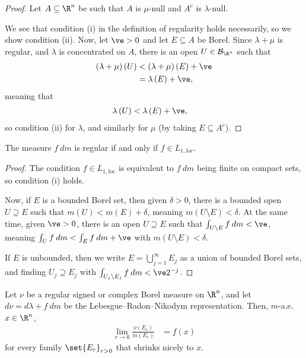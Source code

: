 \documentclass[10pt]{mypackage}
\begin{document}
 \begin{proof}
   Let $A\subseteq \R^n$ be such that $A$ is $\mu$-null and $A^{c}$ is $\lambda$-null.\newline
   
   We see that condition (i) in the definition of regularity holds necessarily, so we show condition (ii). Now, let $\ve > 0$ and let $E \subseteq A$ be Borel. Since $\lambda + \mu$ is regular, and $\lambda$ is concentrated on $A$, there is an open $U\in \mathcal{B}_{\R^n}$ such that
   \begin{align*}
     \left( \lambda + \mu \right)\left( U \right) &< \left( \lambda + \mu \right)\left( E \right) + \ve\\
                                                  &= \lambda\left( E \right) + \ve,
   \end{align*}
   meaning that
   \begin{align*}
     \lambda\left( U \right) &< \lambda\left( E \right) + \ve,
   \end{align*}
   so condition (ii) for $\lambda$, and similarly for $\mu$ (by taking $E\subseteq A^{c}$).
 \end{proof}
 \begin{proposition}
   The measure $f\:dm$ is regular if and only if $f\in L_{1,\text{loc}}$.
 \end{proposition}
 \begin{proof}
   The condition $f\in L_{1,\text{loc}}$ is equivalent to $f\:dm$ being finite on compact sets, so condition (i) holds.\newline

   Now, if $E$ is a bounded Borel set, then given $\delta > 0$, there is a bounded open $U\supseteq E$ such that $m\left( U \right) < m\left( E \right) + \delta$, meaning $m\left( U\setminus E \right) < \delta$. At the same time, given $\ve > 0$, there is an open $U\supseteq E$ such that $ \int_{U\setminus E}^{} f\:dm < \ve $, meaning $ \int_{U}^{} f\:dm < \int_{E}^{} f\:dm + \ve $ with $m\left( U\setminus E \right) < \delta$.\newline

   If $E$ is unbounded, then we write $E = \bigcup_{j=1}^{\infty}E_j$ as a union of bounded Borel sets, and finding $U_j\supseteq E_j$ with $\int_{U_j\setminus E_j}^{} f\:dm < \ve 2^{-j}$.
 \end{proof}
 \begin{theorem}
   Let $\nu$ be a regular signed or complex Borel measure on $\R^n$, and let $d\nu = d\lambda + f\:dm$ be the Lebesgue--Radon--Nikodym representation. Then, $m$-a.e. $x\in \R^n$,
   \begin{align*}
     \lim_{r\rightarrow 0} \frac{\nu\left( E_r \right)}{m\left( E_r \right)} &= f(x)
   \end{align*}
   for every family $\set{E_r}_{r > 0}$ that shrinks nicely to $x$.
 \end{theorem}
\end{document}
